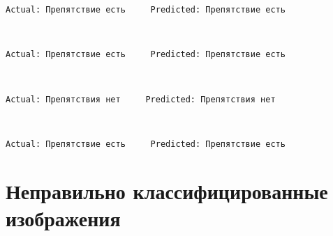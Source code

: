 \documentclass[11pt]{article}
\begin{document}
    \begin{Verbatim}[commandchars=\\\{\}]
Actual: Препятствие есть     Predicted: Препятствие есть

    \end{Verbatim}

    \begin{center}
    \end{center}
    { \hspace*{\fill} \\}
    
    \begin{Verbatim}[commandchars=\\\{\}]
Actual: Препятствие есть     Predicted: Препятствие есть

    \end{Verbatim}

    \begin{center}
    \end{center}
    { \hspace*{\fill} \\}
    
    \begin{Verbatim}[commandchars=\\\{\}]
Actual: Препятствия нет     Predicted: Препятствия нет

    \end{Verbatim}

    \begin{center}
    \end{center}
    { \hspace*{\fill} \\}
    
    \begin{Verbatim}[commandchars=\\\{\}]
Actual: Препятствие есть     Predicted: Препятствие есть

    \end{Verbatim}

    \section{Неправильно классифицированные
изображения}\label{ux43dux435ux43fux440ux430ux432ux438ux43bux44cux43dux43e-ux43aux43bux430ux441ux441ux438ux444ux438ux446ux438ux440ux43eux432ux430ux43dux43dux44bux435-ux438ux437ux43eux431ux440ux430ux436ux435ux43dux438ux44f}
\end{document}
